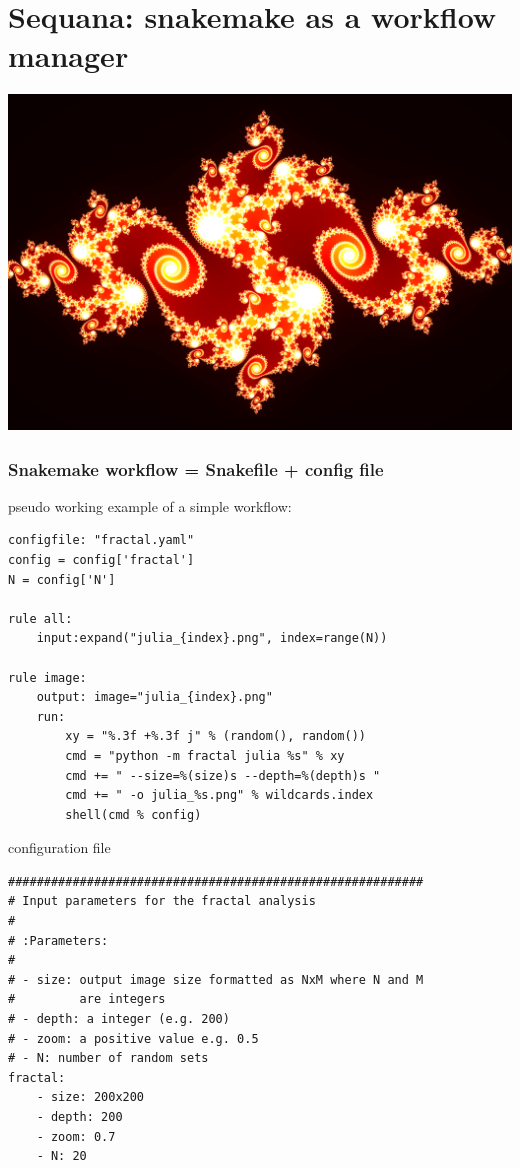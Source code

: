 \documentclass{beamer}
\begin{document}
\section{Sequana: snakemake as a workflow manager}


\begin{frame}
 \includegraphics[width=1.\textwidth, height=0.8\textheight]{images/julia_nice.png}
\end{frame}


\begin{frame}[fragile]
\frametitle{Snakemake workflow = Snakefile + config file}
\begin{block}{pseudo working example of a simple workflow:}
  \begin{lstlisting}
configfile: "fractal.yaml"
config = config['fractal']
N = config['N']

rule all:
    input:expand("julia_{index}.png", index=range(N))

rule image:
    output: image="julia_{index}.png"
    run:
        xy = "%.3f +%.3f j" % (random(), random())
        cmd = "python -m fractal julia %s" % xy
        cmd += " --size=%(size)s --depth=%(depth)s "
        cmd += " -o julia_%s.png" % wildcards.index        
        shell(cmd % config)
\end{lstlisting} 
\end{block}
\end{frame}

\begin{frame}[fragile]
\begin{block}{configuration file}
 \begin{lstlisting}
##########################################################
# Input parameters for the fractal analysis
#
# :Parameters: 
#
# - size: output image size formatted as NxM where N and M 
#         are integers
# - depth: a integer (e.g. 200)
# - zoom: a positive value e.g. 0.5
# - N: number of random sets
fractal:
    - size: 200x200
    - depth: 200
    - zoom: 0.7
    - N: 20
 \end{lstlisting}
\end{block}
\end{frame}
\end{document}
